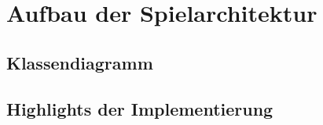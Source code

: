\section{Aufbau der Spielarchitektur}
\subsection{Klassendiagramm}

\subsection{Highlights der Implementierung}